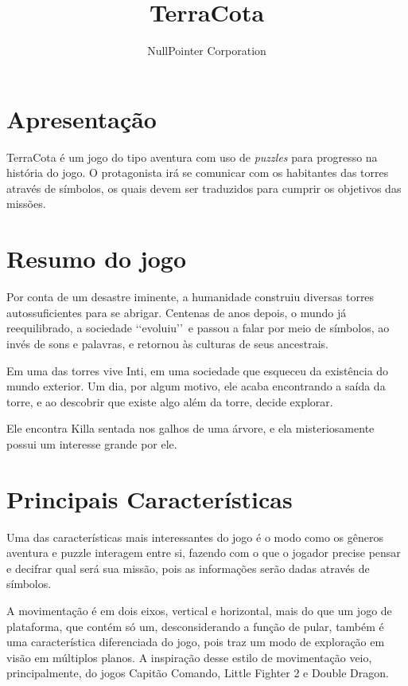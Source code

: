 \documentclass[11pt]{article}
\begin{document}
\title{TerraCota}
\author{NullPointer Corporation}
\date{}
\maketitle

\newpage
\section{Apresentação}
TerraCota é um jogo do tipo aventura com uso de \textit{puzzles} para progresso na história do jogo.  O protagonista irá se comunicar com os habitantes das torres através de símbolos, os quais devem ser traduzidos para cumprir os objetivos das missões.

\section{Resumo do jogo}
Por conta de um desastre iminente, a humanidade construiu diversas torres autossuficientes para se abrigar.
Centenas de anos depois, o mundo já reequilibrado, a sociedade \lq\lq evoluiu\rq\rq\ e passou a falar por meio de símbolos, ao invés de sons e palavras, e retornou às culturas de seus ancestrais.

Em uma das torres vive Inti, em uma sociedade que esqueceu da existência do mundo exterior.  Um dia, por algum motivo, ele acaba encontrando a saída da torre, e ao descobrir que existe algo além da torre, decide explorar.

Ele encontra Killa sentada nos galhos de uma árvore, e ela misteriosamente possui um interesse grande por ele.

\section{Principais Características}
Uma das características mais interessantes do jogo é o modo como os gêneros aventura e puzzle interagem entre si, fazendo com o que o jogador precise pensar e decifrar qual será sua missão, pois as informações serão dadas através de símbolos.

A movimentação é em dois eixos, vertical e horizontal, mais do que um jogo de plataforma, que contém só um, desconsiderando a função de pular, também é uma característica diferenciada do jogo, pois traz um modo de exploração em visão em múltiplos planos. A inspiração desse estilo de movimentação veio, principalmente, do jogos Capitão Comando, Little Fighter 2 e Double Dragon.
\end{document}
